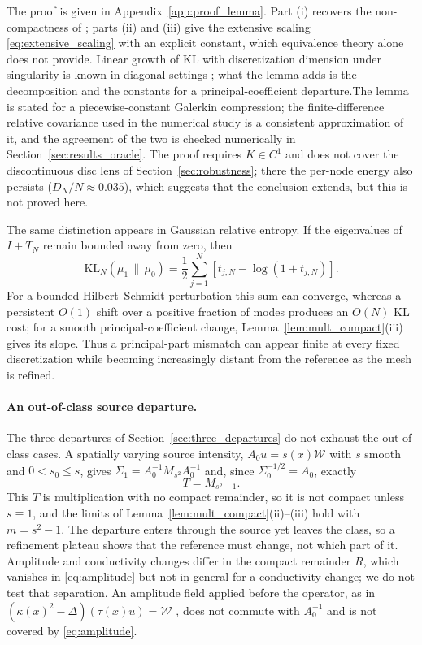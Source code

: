 \documentclass[11pt]{article}
\numberwithin{table}{section}
\numberwithin{figure}{section}
\begin{document}
The proof is given in Appendix~\ref{app:proof_lemma}. Part (i) recovers the non-compactness of \citet[Lemma~4.9]{BolinKirchner2023}; parts (ii) and (iii) give the extensive scaling \eqref{eq:extensive_scaling} with an explicit constant, which equivalence theory alone does not provide. Linear growth of KL with discretization dimension under singularity is known in diagonal settings \citep[Sec.~3.4]{Agapiou2017}; what the lemma adds is the decomposition and the constants for a principal-coefficient departure.The lemma is stated for a piecewise-constant Galerkin compression; the finite-difference relative covariance used in the numerical study is a consistent approximation of it, and the agreement of the two is checked numerically in Section~\ref{sec:results_oracle}. The proof requires $K\in C^1$ and does not cover the discontinuous disc lens of Section~\ref{sec:robustness}; there the per-node energy also persists ($D_N/N\approx0.035$), which suggests that the conclusion extends, but this is not proved here.

The same distinction appears in Gaussian relative entropy. If the eigenvalues of $I+T_N$ remain bounded away from zero, then
\begin{equation}
    \mathrm{KL}_N(\mu_1\,\|\,\mu_0)
    =
    \frac12
    \sum_{j=1}^{N}
    \left[
        t_{j,N}
        -
        \log(1+t_{j,N})
    \right].
    \label{eq:gaussian_kl}
\end{equation}
For a bounded Hilbert--Schmidt perturbation this sum can converge, whereas a persistent $O(1)$ shift over a positive fraction of modes produces an $O(N)$ KL cost; for a smooth principal-coefficient change, Lemma~\ref{lem:mult_compact}(iii) gives its slope. Thus a principal-part mismatch can appear finite at every fixed discretization while becoming increasingly distant from the reference as the mesh is refined.

\paragraph{An out-of-class source departure.} The three departures of Section~\ref{sec:three_departures} do not exhaust the out-of-class cases. A spatially varying source intensity, $A_0u=s(x)\mathcal W$ with $s$ smooth and $0<s_0\le s$, gives $\Sigma_1=A_0^{-1}M_{s^2}A_0^{-1}$ and, since $\Sigma_0^{-1/2}=A_0$, exactly
\begin{equation}
    T=M_{s^2-1}.
    \label{eq:amplitude}
\end{equation}
This $T$ is multiplication with no compact remainder, so it is not compact unless $s\equiv1$, and the limits of Lemma~\ref{lem:mult_compact}(ii)--(iii) hold with $m=s^2-1$. The departure enters through the source yet leaves the class, so a refinement plateau shows that the reference must change, not which part of it. Amplitude and conductivity changes differ in the compact remainder $R$, which vanishes in \eqref{eq:amplitude} but not in general for a conductivity change; we do not test that separation. An amplitude field applied before the operator, as in $(\kappa(x)^2-\Delta)(\tau(x)u)=\mathcal W$ \citep{Ingebrigtsen2015}, does not commute with $A_0^{-1}$ and is not covered by \eqref{eq:amplitude}.
\end{document}
